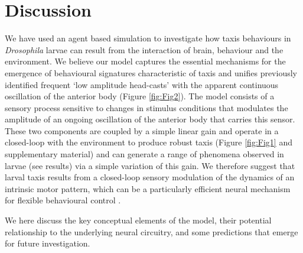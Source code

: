 \documentclass[10pt,a4paper]{article}
\newcommand{\Dros }{\emph{Drosophila }}
\begin{document}
\section{Discussion}
We have used an agent based simulation to investigate how taxis behaviours in \Dros larvae can result from the interaction of brain, behaviour and the environment. We believe our model captures the essential mechanisms for the emergence of behavioural signatures characteristic of taxis and unifies previously identified frequent ‘low amplitude head-casts’ \citep{gomez2014multilevel} with the apparent continuous oscillation of the anterior body (Figure \ref{fig:Fig2}). %
 The model consists of a sensory process sensitive to changes in stimulus conditions that modulates the amplitude of an ongoing oscillation of the anterior body that carries this sensor.
These two components are coupled by a simple linear gain and operate in a closed-loop with the environment to produce robust taxis (Figure \ref{fig:Fig1} and supplementary material) and can generate a range of phenomena observed in larvae (see results) via a simple variation of this gain.
We therefore suggest that larval taxis results from a closed-loop sensory modulation of the dynamics of an intrinsic motor pattern, which can be a particularly efficient neural mechanism for flexible behavioural control \citep{lemon2015whole,izquierdo2010evolution,kanzaki1996behavioral,levi2005role,willis1997active}. 

 We here discuss the key conceptual elements of the model, their potential relationship to the underlying neural circuitry, and some predictions that emerge for future investigation.
\end{document}
